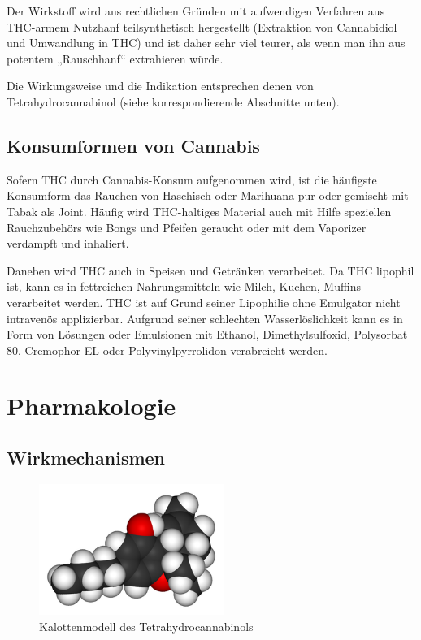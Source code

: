 \documentclass[openany]{scrbook}
\begin{document}
		Der Wirkstoff wird aus rechtlichen Gründen mit aufwendigen Verfahren aus THC-armem Nutzhanf teilsynthetisch hergestellt (Extraktion von Cannabidiol und Umwandlung in THC) und ist daher sehr viel teurer, als wenn man ihn aus potentem „Rauschhanf“ extrahieren würde.
		
		Die Wirkungsweise und die Indikation entsprechen denen von Tetrahydrocannabinol (siehe korrespondierende Abschnitte unten).
		
\subsection{Konsumformen von Cannabis}
	Sofern THC durch Cannabis-Konsum aufgenommen wird, ist die häufigste Konsumform das Rauchen von Haschisch oder Marihuana pur oder gemischt mit Tabak als Joint. Häufig wird THC-haltiges Material auch mit Hilfe speziellen Rauchzubehörs wie Bongs und Pfeifen geraucht oder mit dem Vaporizer verdampft und inhaliert.
	
	Daneben wird THC auch in Speisen und Getränken verarbeitet. Da THC lipophil ist, kann es in fettreichen Nahrungsmitteln wie Milch, Kuchen, Muffins verarbeitet werden. THC ist auf Grund seiner Lipophilie ohne Emulgator nicht intravenös applizierbar. Aufgrund seiner schlechten Wasserlöslichkeit kann es in Form von Lösungen oder Emulsionen mit Ethanol, Dimethylsulfoxid, Polysorbat 80, Cremophor EL oder Polyvinylpyrrolidon verabreicht werden.
	
\section{Pharmakologie}	
\subsection{Wirkmechanismen}

\begin{figure}[h]
	\centering
	\includegraphics[width=6cm]{abb5}
	\caption{Kalottenmodell des Tetrahydrocannabinols}
	\label{fig:800px-Tetrahydrocannabinol-3D-vdW}
\end{figure}
\end{document}
